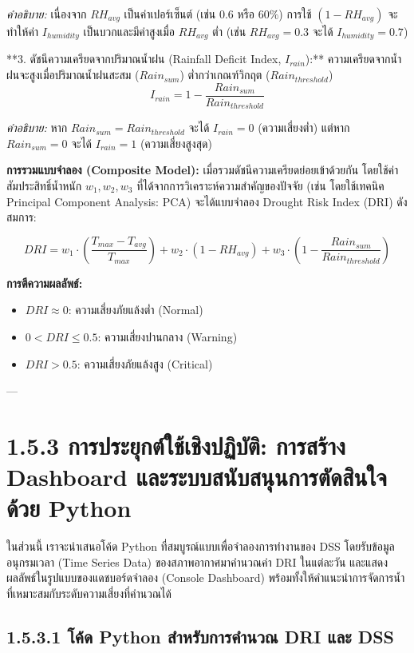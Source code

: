 \documentclass[11pt,a4paper,openany]{report}
\begin{document}
\textit{คำอธิบาย:} เนื่องจาก $RH_{avg}$ เป็นค่าเปอร์เซ็นต์ (เช่น $0.6$ หรือ $60\%$) การใช้ $(1 - RH_{avg})$ จะทำให้ค่า $I_{humidity}$ เป็นบวกและมีค่าสูงเมื่อ $RH_{avg}$ ต่ำ (เช่น $RH_{avg} = 0.3$ จะได้ $I_{humidity} = 0.7$)

**3. ดัชนีความเครียดจากปริมาณน้ำฝน (Rainfall Deficit Index, $I_{rain}$):**
ความเครียดจากน้ำฝนจะสูงเมื่อปริมาณน้ำฝนสะสม ($Rain_{sum}$) ต่ำกว่าเกณฑ์วิกฤต ($Rain_{threshold}$)
$$I_{rain} = 1 - \frac{Rain_{sum}}{Rain_{threshold}}$$

\textit{คำอธิบาย:} หาก $Rain_{sum} = Rain_{threshold}$ จะได้ $I_{rain} = 0$ (ความเสี่ยงต่ำ) แต่หาก $Rain_{sum} = 0$ จะได้ $I_{rain} = 1$ (ความเสี่ยงสูงสุด)

\textbf{การรวมแบบจำลอง (Composite Model):}
เมื่อรวมดัชนีความเครียดย่อยเข้าด้วยกัน โดยใช้ค่าสัมประสิทธิ์น้ำหนัก $w_1, w_2, w_3$ ที่ได้จากการวิเคราะห์ความสำคัญของปัจจัย (เช่น โดยใช้เทคนิค Principal Component Analysis: PCA) จะได้แบบจำลอง Drought Risk Index (DRI) ดังสมการ:

$$DRI = w_1 \cdot \left(\frac{T_{max} - T_{avg}}{T_{max}}\right) + w_2 \cdot (1 - RH_{avg}) + w_3 \cdot \left(1 - \frac{Rain_{sum}}{Rain_{threshold}}\right)$$


\textbf{การตีความผลลัพธ์:}
\begin{itemize}
  \item $DRI \approx 0$: ความเสี่ยงภัยแล้งต่ำ (Normal)
  \item $0 < DRI \le 0.5$: ความเสี่ยงปานกลาง (Warning)
  \item $DRI > 0.5$: ความเสี่ยงภัยแล้งสูง (Critical)
\end{itemize}


---

\section{1.5.3 การประยุกต์ใช้เชิงปฏิบัติ: การสร้าง Dashboard และระบบสนับสนุนการตัดสินใจด้วย Python}


ในส่วนนี้ เราจะนำเสนอโค้ด Python ที่สมบูรณ์แบบเพื่อจำลองการทำงานของ DSS โดยรับข้อมูลอนุกรมเวลา (Time Series Data) ของสภาพอากาศมาคำนวณค่า DRI ในแต่ละวัน และแสดงผลลัพธ์ในรูปแบบของแดชบอร์ดจำลอง (Console Dashboard) พร้อมทั้งให้คำแนะนำการจัดการน้ำที่เหมาะสมกับระดับความเสี่ยงที่คำนวณได้

\subsection{1.5.3.1 โค้ด Python สำหรับการคำนวณ DRI และ DSS}
\end{document}
